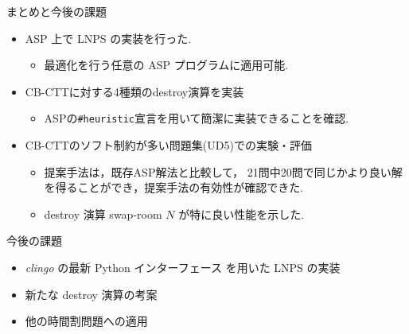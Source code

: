 \documentclass[11pt,dvipdfmx,handout]{beamer}
\begin{document}
\begin{frame}{まとめと今後の課題}
\begin{block}{}
\begin{itemize}
\item ASP 上で LNPS の実装を行った.
 \begin{itemize}
  \item 最適化を行う任意の ASP プログラムに適用可能.
 \end{itemize}
\item CB-CTTに対する4種類のdestroy演算を実装
  \begin{itemize}
  \item ASPの\texttt{\#heuristic}宣言を用いて簡潔に実装できることを確認.
  \end{itemize}
\item  CB-CTTのソフト制約が多い問題集(UD5)での実験・評価
  \begin{itemize}
  \item  提案手法は，既存ASP解法と比較して，
  21問中20問で同じかより良い解を得ることができ，提案手法の有効性が確認できた.
  \item destroy 演算 swap-room $N$ が特に良い性能を示した.
  \end{itemize}
\end{itemize}
\end{block}
    
\begin{alertblock}{今後の課題}
  \begin{itemize}
  \item \textit{clingo} の最新 Python インターフェース を用いた LNPS の実装
  \item 新たな destroy 演算の考案
  \item 他の時間割問題への適用
  \end{itemize}
\end{alertblock}
\end{frame}
\end{document}
